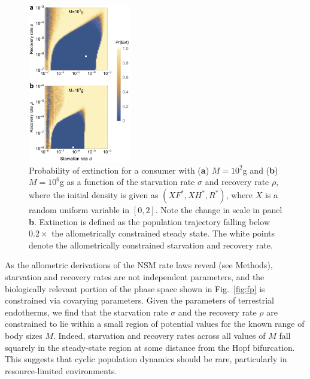 \documentclass[twocolumn,preprintnumbers,amsmath,amssymb,superscriptaddress]{revtex4}
\begin{document}
\begin{bibunit}[unsrt]
  \begin{figure}
  \centering
  \includegraphics[width=0.4\textwidth]{fig_ExtinctionAllometricComb4-eps-converted-to.pdf}
  \caption{\small{ Probability of extinction for a consumer with ({\bf a}) $M=10^2$g and ({\bf b}) $M=10^6$g as a function of the starvation rate $\sigma$ and recovery rate $\rho$, where the initial density is given as $(XF^*,XH^*,R^*)$, where $X$ is a random uniform variable in $[0,2]$. Note the change in scale in panel {\bf b}.  Extinction is defined as the population trajectory falling below $0.2\times$ the allometrically constrained steady state. The white points denote the allometrically constrained starvation and recovery rate.}\label{fig:ext}}
  \end{figure}

  As the allometric derivations of the NSM rate laws reveal (see Methods),
  starvation and recovery rates are not independent parameters, and the
  biologically relevant portion of the phase space shown in Fig.~\ref{fig:fp}
  is constrained via covarying parameters.  Given the parameters of terrestrial
  endotherms, we find that the starvation rate $\sigma$ and the recovery rate
  $\rho$ are constrained to lie within a small region of potential values for
  the known range of body sizes $M$.  Indeed, starvation and recovery rates
  across all values of $M$ fall squarely in the steady-state region at some
  distance from the Hopf bifurcation.  This suggests that cyclic population
  dynamics should be rare, particularly in resource-limited environments.


\end{bibunit}
\end{document}
